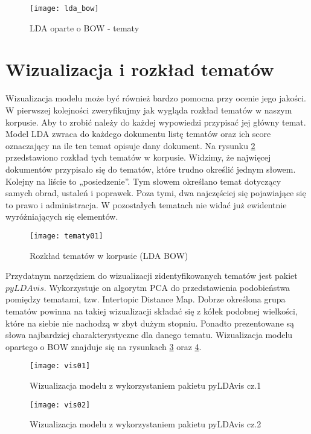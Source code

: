 \documentclass[a4paper,11pt,twoside]{report}
\theoremstyle{definition}
\begin{document}
\begin{figure}
\texttt{[image: lda\_bow]} 
\centering \caption{LDA oparte o BOW - tematy}
\label{pic:lda1}
\end{figure}



\section{Wizualizacja i rozkład tematów}\label{section:ldavis}
Wizualizacja modelu może być również bardzo pomocna przy ocenie jego jakości. W pierwszej kolejności zweryfikujmy jak wygląda rozkład tematów w naszym korpusie. Aby to zrobić należy do każdej wypowiedzi przypisać jej główny temat. Model LDA zwraca do każdego dokumentu listę tematów oraz ich score oznaczający na ile ten temat opisuje dany dokument. Na rysunku \ref{top_dist01} przedstawiono rozkład tych tematów w korpusie. Widzimy, że najwięcej dokumentów przypisało się do tematów, które trudno określić jednym słowem. Kolejny na liście to „posiedzenie”. Tym słowem określano temat dotyczący samych obrad, ustaleń i poprawek. Poza tymi, dwa najczęściej się pojawiające się to prawo i administracja. W pozostałych tematach nie widać już ewidentnie wyróżniających się elementów.
\begin{figure}
\texttt{[image: tematy01]} 
\centering \caption{Rozkład tematów w korpusie (LDA BOW)}
 \label{top_dist01}
\end{figure}

Przydatnym narzędziem do wizualizacji zidentyfikowanych tematów jest pakiet $pyLDAvis$. Wykorzystuje on algorytm PCA do przedstawienia podobieństwa pomiędzy tematami, tzw. Intertopic Distance Map. Dobrze określona grupa tematów powinna na takiej wizualizacji składać się z kółek podobnej wielkości, które na siebie nie nachodzą w zbyt dużym stopniu. Ponadto prezentowane są słowa najbardziej charakterystyczne dla danego tematu. Wizualizacja modelu opartego o BOW znajduje się na rysunkach \ref{vis01} oraz \ref{vis02}.

\begin{figure}
\texttt{[image: vis01]} 
\centering \caption{Wizualizacja modelu z wykorzystaniem pakietu pyLDAvis cz.1}
 \label{vis01}
\end{figure}

\begin{figure}
\texttt{[image: vis02]} 
\centering \caption{Wizualizacja modelu z wykorzystaniem pakietu pyLDAvis cz.2}
 \label{vis02}
\end{figure}
\end{document}
